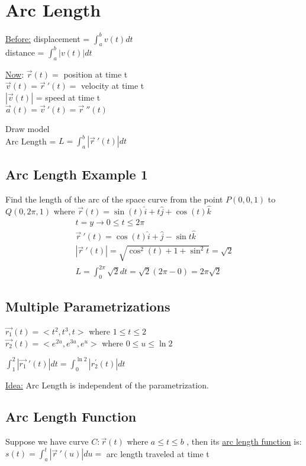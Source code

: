 \documentclass[12pt]{article}
\begin{document}
\section{Arc Length}

\underline{Before:} displacement = \(\int_{a}^{b} v(t)dt\) \\%
distance = \(\int_{a}^{b} |v(t)|dt\)\

\underline{Now}: \(\vec{r} (t) = \) position at time t\\%
\(\vec{v} (t) = \vec{r}\ '(t) =    \) velocity at time t\\%
\(|\vec{v} (t)| \) = speed at time t\\%
\(\vec{a} (t) = \vec{v}\ '(t) = \vec{r}\ ''(t)   \) 

Draw model\\%
Arc Length = \(L =\int_{a}^{b} |\vec{r}\ '(t) |dt\) 

\subsection{Arc Length Example 1}
Find the length of the arc of the space curve from the point \(P(0,0,1)\) to \(Q(0,2\pi,1)\) where \(\vec{r} (t) = \sin(t)\hat{i} + t\hat{j} + \cos(t)\hat{k} \) 
\begin{align}
	t=y \rightarrow 0 \leq	t \leq	2\pi\\%
	\vec{r}\ '(t) = \cos(t)\hat{i} + \hat{j} - \sin{t}\hat{k}\\%
	|\vec{r}\ '(t) | = \sqrt{\cos^2(t) + 1 + \sin^2{t}}= \sqrt{2}\\%
	L = \int_{0}^{2\pi}\sqrt{2}dt = \sqrt{2}(2\pi - 0) = 2\pi\sqrt{2}	
\end{align}

\subsection{Multiple Parametrizations}
\(\vec{r_1} (t) = <t^2,t^3,t>\) where \( 1\leq t\leq 2 \) \\%
\(\vec{r_2} (t) = <e^{2u},e^{3u},e^u>  \) where \(0 \leq u \leq \ln{2}\) 

\(\int_{1}^{2} |\vec{r_1}\ ' (t)| dt = \int_{0}^{\ln{2}} |r^{'}_2(t)|dt\) 

\underline{Idea:} Arc Length is independent of the parametrization.

\subsection{Arc Length Function}
Suppose we have curve \(C: \vec{r} (t) \) where \(a\leq t\leq b\)  , then its \underline{arc length function} is:\\%
\(s(t) = \int_{a}^{t} |\vec{r}\ '(u) |du = \) arc length traveled at time t
\end{document}

